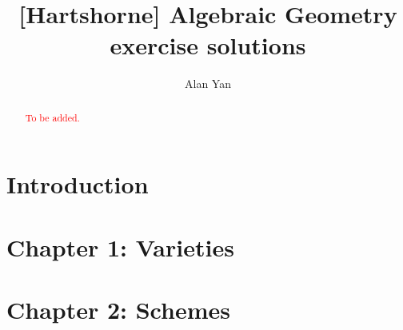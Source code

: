 \documentclass[]{pcmi}
\theoremstyle{plain}
\theoremstyle{definition}
\theoremstyle{remark}
\begin{document}
%
%

\title[Algebraic Geometry]{[Hartshorne] Algebraic Geometry exercise solutions} 

%    
%    
\author{Alan Yan}
\date{} 
\address{
\newline Department of Mathematics,
Harvard University,
Cambridge, MA 02138 
}

%    
%    
\keywords{}
\begin{abstract}
    \textcolor{red}{To be added.}
\end{abstract}

%    
%    
\maketitle

\tableofcontents

%    
%    



\section{Introduction} 

\section{Chapter 1: Varieties}

\section{Chapter 2: Schemes}
\end{document}
